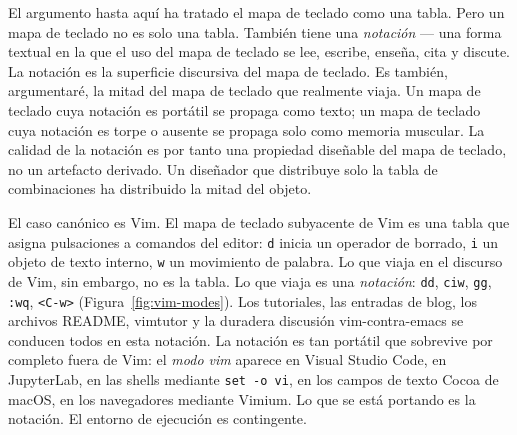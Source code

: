 \documentclass[10pt,letterpaper,twocolumn]{article}
\begin{document}
El argumento hasta aquí ha tratado el mapa de teclado como una tabla. Pero un mapa de teclado no es solo una tabla. También tiene una \emph{notación} --- una forma textual en la que el uso del mapa de teclado se lee, escribe, enseña, cita y discute. La notación es la superficie discursiva del mapa de teclado. Es también, argumentaré, la mitad del mapa de teclado que realmente viaja. Un mapa de teclado cuya notación es portátil se propaga como texto; un mapa de teclado cuya notación es torpe o ausente se propaga solo como memoria muscular. La calidad de la notación es por tanto una propiedad diseñable del mapa de teclado, no un artefacto derivado. Un diseñador que distribuye solo la tabla de combinaciones ha distribuido la mitad del objeto.

El caso canónico es Vim. El mapa de teclado subyacente de Vim es una tabla que asigna pulsaciones a comandos del editor: \texttt{d} inicia un operador de borrado, \texttt{i} un objeto de texto interno, \texttt{w} un movimiento de palabra. Lo que viaja en el discurso de Vim, sin embargo, no es la tabla. Lo que viaja es una \emph{notación}: \texttt{dd}, \texttt{ciw}, \texttt{gg}, \texttt{:wq}, \texttt{<C-w>} (Figura~\ref{fig:vim-modes}). Los tutoriales, las entradas de blog, los archivos README, vimtutor y la duradera discusión vim-contra-emacs se conducen todos en esta notación. La notación es tan portátil que sobrevive por completo fuera de Vim: el \emph{modo vim} aparece en Visual Studio Code, en JupyterLab, en las shells mediante \texttt{set -o vi}, en los campos de texto Cocoa de macOS, en los navegadores mediante Vimium. Lo que se está portando es la notación. El entorno de ejecución es contingente.
\end{document}
